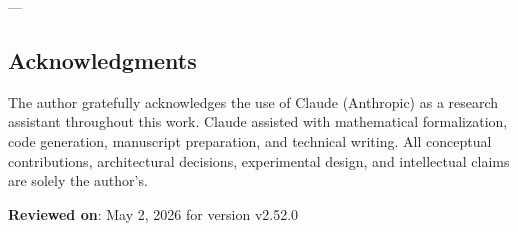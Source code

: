 ---
\subsection{Acknow\-ledgments}

The author gratefully ackno\-wledges the use of Claude (Anthropic) as a research assistant throughout this work. Claude assisted with mathe\-matical forma\-lization, code generation, manuscript preparation, and technical writing. All conceptual contr\-ibutions, archi\-tectural decisions, exper\-imental design, and intel\-lectual claims are solely the author's.

\textbf{Reviewed on}: May 2, 2026 for version v2.52.0
